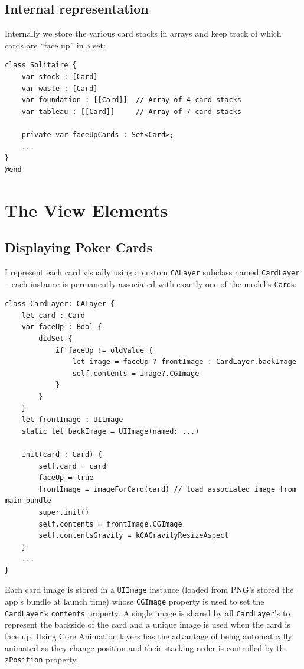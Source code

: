 \documentclass[11pt]{article}
\begin{document}

\subsection{Internal representation}

Internally we store the various card stacks in arrays and keep track
of which cards are ``face up'' in a set:
\begin{verbatim}
class Solitaire {
    var stock : [Card]
    var waste : [Card]
    var foundation : [[Card]]  // Array of 4 card stacks
    var tableau : [[Card]]     // Array of 7 card stacks
    
    private var faceUpCards : Set<Card>;
    ...
}
@end
\end{verbatim}

\section{The View Elements} \label{sec:view}

\subsection{Displaying Poker Cards}

I represent each card visually using a custom
{\tt CALayer} subclass named {\tt CardLayer} -- each instance is permanently associated
with exactly one of the model's {\tt Card}s:
\begin{verbatim}
class CardLayer: CALayer {
    let card : Card
    var faceUp : Bool {
        didSet {
            if faceUp != oldValue {
                let image = faceUp ? frontImage : CardLayer.backImage
                self.contents = image?.CGImage
            }
        }
    }
    let frontImage : UIImage 
    static let backImage = UIImage(named: ...)
    
    init(card : Card) {
        self.card = card
        faceUp = true
        frontImage = imageForCard(card) // load associated image from main bundle
        super.init()
        self.contents = frontImage.CGImage
        self.contentsGravity = kCAGravityResizeAspect
    }
    ...
}
\end{verbatim}
Each card image is stored in a {\tt UIImage} instance 
(loaded from PNG's stored the app's bundle at launch time)
whose {\tt CGImage} property is used to set the {\tt CardLayer}'s 
{\tt contents} property.
A single image is shared
by all {\tt CardLayer}'s to represent the backside of the card
and a unique image is used when the card is face up.
Using Core Animation layers has the advantage of being automatically
animated as they change position and their stacking order is
controlled by the {\tt zPosition} property. 
\end{document}
